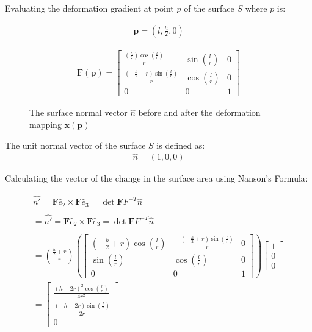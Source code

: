 \begin{problem}
    \noindent
    \normalfont
    Evaluating the deformation gradient at point $p$ of the surface $S$ where $p$ is:

\begin{align}
    \mathbf{p}=\left( l, \frac{h}{2},0 \right)
\end{align}

\begin{align}
\mathbf{F}(\mathbf{p})=\begin{bmatrix}
\frac{\left( \frac{h}{2} \right)\cos\left( \frac{l}{r} \right)}{r} & \sin\left( \frac{l}{r} \right) & 0 \\
\frac{\left( -\frac{h}{2}+r \right)\sin\left( \frac{l}{r} \right) }{r} & \cos\left( \frac{l}{r} \right) & 0 \\
0 & 0 & 1
\end{bmatrix}
\end{align}
\begin{figure}[htbp]
    \centering
    \caption{The surface normal vector $\hat{n}$ before and after the deformation mapping $\mathbf{x}(\mathbf{p})$}
    \label{fig:deform}
\end{figure}

The unit normal vector of the surface $S$ is defined as:
\begin{align}
\hat{n}=(1,0,0) \label{normal}
\end{align}

Calculating the vector of the change in the surface area using Nanson's Formula:

\begin{align}
\hat{n'}=\mathbf{F}\hat{e}_{2}\times \mathbf{F}\hat{e}_{3}=\det \mathbf{F}F^{-T}\hat{n} \\ \\
=\hat{n'}=\mathbf{F}\hat{e}_{2}\times \mathbf{F}\hat{e}_{3}=\det \mathbf{F}F^{-T}\hat{n} \\ \\
=\left( \frac{\frac{h}{2}+r}{r} \right)\left( \begin{bmatrix}
\left( -\frac{h}{2}+r \right)\cos\left( \frac{l}{r} \right)&-\frac{\left( -\frac{h}{2}+r \right)\sin\left( \frac{l}{r} \right)}{r} & 0 \\
\sin\left( \frac{l}{r} \right) & \cos\left( \frac{l}{r} \right) & 0 \\
0 & 0 & 1
\end{bmatrix} \right)\begin{bmatrix}
1 \\
0 \\
0
\end{bmatrix} \\
= \begin{bmatrix}
\frac{(h-2r)^2\cos\left( \frac{l}{r} \right)}{4r^2} \\
\frac{(-h+2r)\sin\left( \frac{l}{r} \right)}{2r} \\
0
\end{bmatrix} \label{nanson} 
\end{align}



\end{problem}
